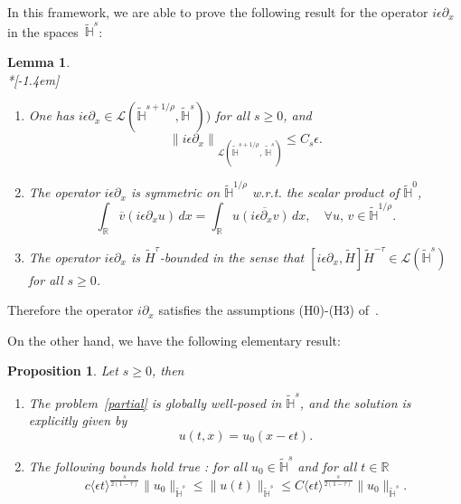 \documentclass[10pt]{amsart}
\newtheorem{lemm}[theo]{Lemma}\newtheorem{prop}[theo]{Proposition}\newtheorem{coro}[theo]{Corollary}\newtheorem{conj}[theo]{Conjecture}
\theoremstyle{definition}\newtheorem{defi}[theo]{Definition}\newtheorem{rema}[theo]{Remark}\newtheorem{exam}[theo]{Example}\newtheorem{exem}[theo]{Example}\newtheorem{nota}[theo]{Notation}
\newcommand{\R}{\mathbb{R}}
\newcommand{\HH}{\mathbb{H}}
\newcommand{\clL}{\mathcal{L}}
\newcommand*\eps{\epsilon}
\newcommand{\ov}{\overline}
\newcommand{\wt}{\widetilde}
\newcommand{\<}{\langle}
\renewcommand{\>}{\rangle}
\newcommand*{\romanenumi}{\renewcommand*{\theenumi}{\roman{enumi}}}
\let\oldforall\forall
\renewcommand*{\forall}{\mathrel{\oldforall}}
\begin{document}
In this framework, we are able to prove the following result for the operator $i \eps \partial_x$ in the spaces~$\widetilde{\HH}^{s} $:



\begin{lemm}\label{lem-partial}\ \\*[-1.4em]
\begin{enumerate}\romanenumi
\item\label{lemm.A.1.1} One has $i \eps \partial_x \in \clL(\widetilde{\HH}^{s+1/\rho}, \widetilde{\HH}^{s}))$ for all $s \geq 0$, and
\[
\left\| i \eps\partial_x\right\|_{ \clL\left(\widetilde{\HH}^{s+1/\rho},\,\widetilde{\HH}^{s}\right)} \leq C_s \eps.
\]
\item\label{lemm.A.1.2} The operator $i \eps \partial_x$ is symmetric on $ \widetilde{\HH}^{1/\rho}$ w.r.t. the scalar product of $\widetilde{\HH}^{0}$,
\[
\int_{\R} \ov{v} \left(i\eps \partial_x u\right) \,dx= \int_{\R} u\ov{\left(i\eps \partial_x v\right)}\,dx, \quad \forall{u,\,v \in \widetilde{\HH}^{1/\rho}}.
\]
\item\label{lemm.A.1.3} The operator $i \eps \partial_x$ is $\wt{H}^{\tau}$-bounded in the sense that $ [i \eps \partial_x, \wt{H}] \wt{H}^{-\tau} \in \clL(\widetilde{\HH}^{s})$ for all $s \geq 0$.
\end{enumerate}
\end{lemm}

Therefore the operator $i \partial_x$ satisfies the assumptions (H0)-(H3) of~\cite{MasRo}.


On the other hand, we have the following elementary result:

\begin{prop}\label{thm-abs2}
Let $s\geq 0$, then
\begin{enumerate}\romanenumi
\item\label{prop.A.2.1} The problem~\eqref{partial} is globally well-posed in $\widetilde{\HH}^{s}$, and the solution is explicitly given by
\[
u(t,x)=u_0(x-\eps t).
\]
\item\label{prop.A.2.2} The following bounds hold true : for all $u_0\in \widetilde{\HH}^{s}$ and for all $t\in \R$
\begin{equation}\label{bound.prop}
c \<\eps t\>^{\frac s{2(1-\tau)}} \| u_0\|_{\widetilde{\HH}^{s}} \leq
\| u(t)\|_{\widetilde{\HH}^{s}}\leq C \<\eps t\>^{\frac s{2(1-\tau)}}\| u_0\|_{\widetilde{\HH}^{s}}.
\end{equation}
\end{enumerate}
\end{prop}
\end{document}
